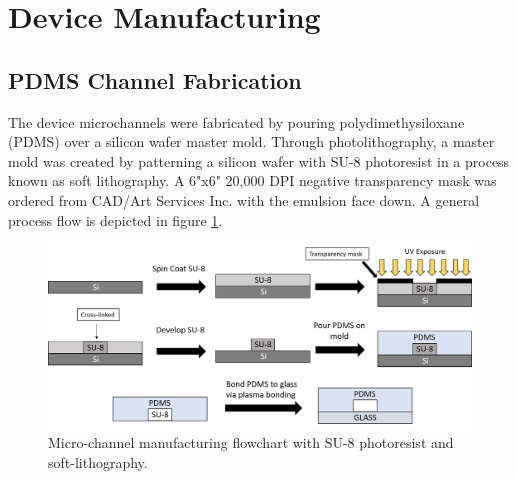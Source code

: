
\section{Device Manufacturing}

\subsection{PDMS Channel Fabrication}
\par The device microchannels were fabricated by pouring polydimethysiloxane (PDMS) over a silicon wafer master mold. Through photolithography, a master mold was created by patterning a silicon wafer with SU-8 photoresist in  a process known as soft lithography. A 6"x6" 20,000 DPI negative transparency mask was ordered from CAD/Art Services Inc. with the emulsion face down. A general process flow is depicted in figure \ref{fig:soft_lithography}.
 \begin{figure}[h]
     \centering
     \includegraphics[width=\textwidth]{images/softLithography.png}
     \caption{Micro-channel manufacturing flowchart with SU-8 photoresist and soft-lithography.}
     \label{fig:soft_lithography}
 \end{figure}
